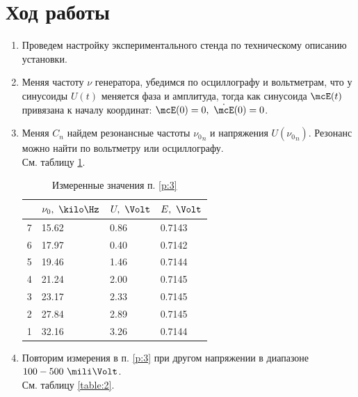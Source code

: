 \documentclass{report}
\begin{document}
\section{Ход работы}
\begin{enumerate}
	\item Проведем настройку экспериментального стенда по техническому
	      описанию установки.

	\item Меняя частоту $ \nu $ генератора, убедимся по осциллографу и
	      вольтметрам, что у синусоиды $ U(t) $ меняется фаза и амплитуда,
	      тогда как синусоида  $ \mcE(t) $ привязана к началу координат:
	      $ \mcE(0) = 0,\ \dot{\mcE}(0) = 0 $.

	\item \label{p:3} Меняя $ C_n $ найдем резонансные частоты $ {\nu_0}_n $ и напряжения
	      $ U({\nu_0}_n) $. Резонанс можно найти по вольтметру или осциллографу.\\
	      См. таблицу \ref{table:1}.

	      \begin{table}[H]
		      \centering
		      \begin{tabular}{l|lll}
			        & $ \nu_0,\ \kilo\Hz $ & $ U,\ \Volt $ & $ E,\ \Volt $ \\
			      \hline
			      7 & 15.62                & 0.86          & 0.7143        \\
			      6 & 17.97                & 0.40          & 0.7142        \\
			      5 & 19.46                & 1.46          & 0.7144        \\
			      4 & 21.24                & 2.00          & 0.7145        \\
			      3 & 23.17                & 2.33          & 0.7145        \\
			      2 & 27.84                & 2.89          & 0.7145        \\
			      1 & 32.16                & 3.26          & 0.7144        \\
		      \end{tabular}
		      \caption{Измеренные значения п. \ref{p:3}}
		      \label{table:1}
	      \end{table}


	\item \label{p:4} Повторим измерения в п. \ref{p:3} при другом напряжении в
	      диапазоне $ 100 - 500\ \mili\Volt $.\\
	      См. таблицу \ref{table:2}.


\end{enumerate}
\end{document}
